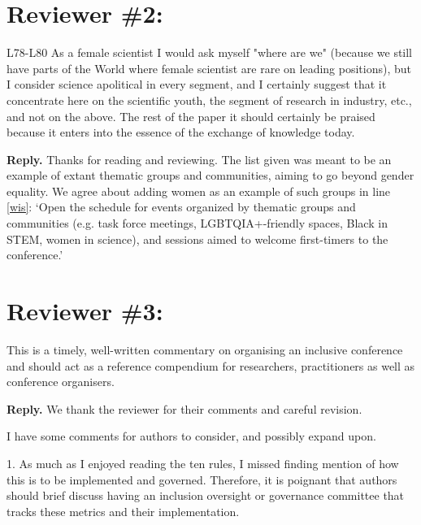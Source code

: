 \documentclass{article}
\newenvironment{Reply}{\noindent\color{BlueViolet}\textbf{Reply.}}{\vspace{1em}}
\begin{document}
\section*{Reviewer \#2:}
L78-L80 As a female scientist I would ask myself "where are we" (because we still have parts of the World where female scientist are rare on leading positions), but I consider science apolitical in every segment, and I certainly suggest that it concentrate here on the scientific youth, the segment of research in industry, etc., and not on the above.
The rest of the paper it should certainly be praised because it enters into the essence of the exchange of knowledge today.

\begin{Reply}
    Thanks for reading and reviewing. The list given was meant to be an example of extant thematic groups and communities, aiming to go beyond gender equality. 
    We agree about adding women as an example of such groups in line \ref{wis}:
    `Open the schedule for events organized by thematic groups and communities (e.g. task force meetings, LGBTQIA+-friendly spaces, Black in STEM, women in science), and sessions aimed to welcome first-timers to the conference.'
\end{Reply}

\section*{Reviewer \#3:} 
This is a timely, well-written commentary on organising an inclusive conference and should act as a reference compendium for researchers, practitioners as well as conference organisers.

\begin{Reply}
    We thank the reviewer for their comments and careful revision.
\end{Reply}

I have some comments for authors to consider, and possibly expand upon.

1. As much as I enjoyed reading the ten rules, I missed finding mention of how this is to be implemented and governed. Therefore, it is poignant that authors should brief discuss having an inclusion oversight or governance committee that tracks these metrics and their implementation.
\end{document}
